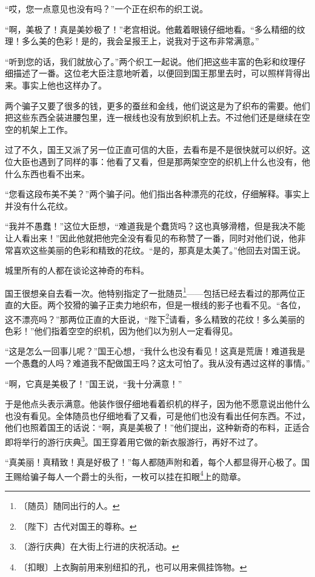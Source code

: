 \documentclass[12pt,UTF-8,openany]{ctexbook}
\begin{document}
\begin{large}
    “哎，您一点意见也没有吗？”一个正在织布的织工说。
    
    “啊，美极了！真是美妙极了！”老宫相说。他戴着眼镜仔细地看。“多么精细的纹理！多么美的色彩！是的，我会呈报王上，说我对于这布非常满意。”
    
    “听到您的话，我们就放心了。”两个织工一起说。他们把这些丰富的色彩和纹理仔细描述了一番。这位老大臣注意地听着，以便回到国王那里去时，可以照样背得出来。事实上他也这样办了。
    
    两个骗子又要了很多的钱，更多的蚕丝和金线，他们说这是为了织布的需要。他们把这些东西全装进腰包里，连一根线也没有放到织机上去。不过他们还是继续在空空的机架上工作。
    
    过了不久，国王又派了另一位正直可信的大臣，去看布是不是很快就可以织好。这位大臣也遇到了同样的事：他看了又看，但是那两架空空的织机上什么也没有，他什么东西也看不出来。
    
    “您看这段布美不美？”两个骗子问。他们指出各种漂亮的花纹，仔细解释。事实上并没有什么花纹。
    
    “我并不愚蠢！”这位大臣想，“难道我是个蠢货吗？这也真够滑稽，但是我决不能让人看出来！”因此他就把他完全没有看见的布称赞了一番，同时对他们说，他非常喜欢这些美丽的色彩和精致的花纹。“是的，那真是太美了。”他回去对国王说。
    
    城里所有的人都在谈论这神奇的布料。
    
    国王很想亲自去看一次。他特别指定了一批随员\footnote{〔随员〕随同出行的人。}——包括已经去看过的那两位正直的大臣。两个狡猾的骗子正卖力地织布，但是一根线的影子也看不见。“各位，这不漂亮吗？”那两位正直的大臣说，“陛下\footnote{〔陛下〕古代对国王的尊称。}请看，多么精致的花纹！多么美丽的色彩！”他们指着空空的织机，因为他们以为别人一定看得见。
    
    “这是怎么一回事儿呢？”国王心想，“我什么也没有看见！这真是荒唐！难道我是一个愚蠢的人吗？难道我不配做国王吗？这太可怕了。我从没有遇过这样的事情。”
    
    “啊，它真是美极了！”国王说，“我十分满意！”
    
    于是他点头表示满意。他装作很仔细地看着织机的样子，因为他不愿意说出他什么也没有看见。全体随员也仔细地看了又看，可是他们也没有看出任何东西。不过，他们也照着国王的话说：“啊，真是美极了！”他们提出，这种新奇的布料，正适合即将举行的游行庆典\footnote{〔游行庆典〕在大街上行进的庆祝活动。}。国王穿着用它做的新衣服游行，再好不过了。
    
    “真美丽！真精致！真是好极了！”每人都随声附和着，每个人都显得开心极了。国王赐给骗子每人一个爵士的头衔，一枚可以挂在扣眼\footnote{〔扣眼〕上衣胸前用来别纽扣的孔，也可以用来佩挂饰物。}上的勋章。
    

\end{large}
\end{document}
